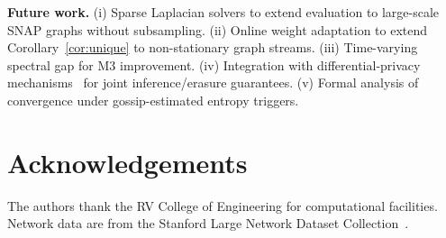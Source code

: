 \documentclass[review,12pt]{elsarticle}
\begin{document}
\textbf{Future work.} (i) Sparse Laplacian solvers to extend evaluation to
large-scale SNAP graphs without subsampling. (ii) Online weight adaptation to
extend Corollary~\ref{cor:unique} to non-stationary graph streams.
(iii) Time-varying spectral gap for M3 improvement.
(iv) Integration with differential-privacy
mechanisms~\cite{dwork2014algorithmic} for joint inference/erasure guarantees.
(v) Formal analysis of convergence under gossip-estimated entropy triggers.

\section*{Acknowledgements}

The authors thank the RV College of Engineering for computational facilities.
Network data are from the Stanford Large Network Dataset
Collection~\cite{snapnets}.



\end{document}
